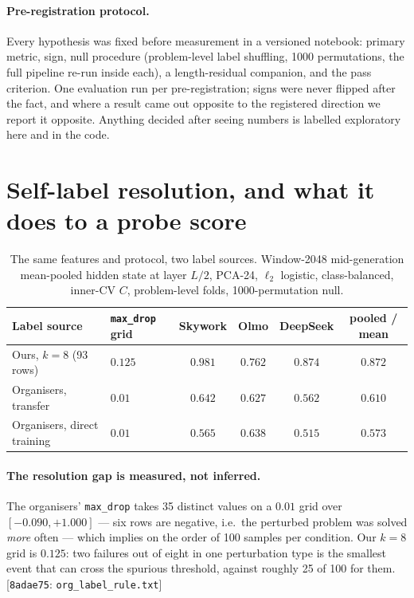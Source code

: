 \documentclass[10pt]{article}
\newcommand{\cmt}[2]{{\footnotesize\textsf{[}\texttt{#1}\textsf{:} #2\textsf{]}}}
\begin{document}
\paragraph{Pre-registration protocol.} Every hypothesis was fixed before measurement in a versioned
notebook: primary metric, sign, null procedure (problem-level label shuffling, 1000 permutations,
the full pipeline re-run inside each), a length-residual companion, and the pass criterion. One
evaluation run per pre-registration; signs were never flipped after the fact, and where a result came
out opposite to the registered direction we report it opposite. Anything decided after seeing numbers
is labelled exploratory here and in the code.

\section{Self-label resolution, and what it does to a probe score}
\label{sec:resolution}
\begin{table}[t]
\centering\small
\caption{The same features and protocol, two label sources. Window-2048 mid-generation mean-pooled
hidden state at layer $L/2$, PCA-24, $\ell_2$ logistic, class-balanced, inner-CV $C$, problem-level
folds, 1000-permutation null.}
\label{tab:resolution}
\begin{tabular}{llcccc}
\toprule
Label source & \texttt{max\_drop} grid & Skywork & Olmo & DeepSeek & pooled / mean \\
\midrule
Ours, $k{=}8$ (93 rows)      & $0.125$ & $0.981$ & $0.762$ & $0.874$ & $\mathbf{0.872}$ \\
Organisers, transfer         & $0.01$  & $0.642$ & $0.627$ & $0.562$ & $\mathbf{0.610}$ \\
Organisers, direct training  & $0.01$  & $0.565$ & $0.638$ & $0.515$ & $\mathbf{0.573}$ \\
\bottomrule
\end{tabular}
\end{table}

\paragraph{The resolution gap is measured, not inferred.} The organisers' \texttt{max\_drop} takes
35 distinct values on a $0.01$ grid over $[-0.090, +1.000]$ --- six rows are negative, i.e.\ the
perturbed problem was solved \emph{more} often --- which implies on the order of 100 samples per
condition. Our $k{=}8$ grid is $0.125$: two failures out of eight in one perturbation type is the
smallest event that can cross the spurious threshold, against roughly 25 of 100 for them.
\cmt{8adae75}{\texttt{org\_label\_rule.txt}}
\end{document}
